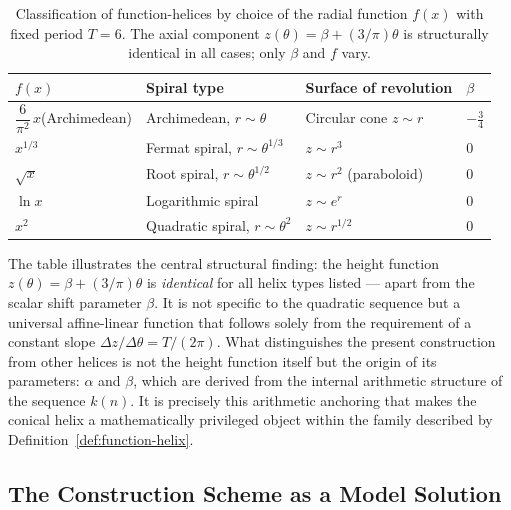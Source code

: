 \begin{table}[H]
\centering
\caption{Classification of function-helices by choice of the radial
  function $f(x)$ with fixed period $T = 6$. The axial component
  $z(\theta) = \beta + (3/\pi)\theta$ is structurally identical in all
  cases; only $\beta$ and $f$ vary.}
\renewcommand{\arraystretch}{1.4}
\begin{tabular}{llll}
\toprule
$f(x)$ & Spiral type & Surface of revolution & $\beta$ \\
\midrule
$\dfrac{6}{\pi^2}\,x$\quad (Archimedean)
  & Archimedean, $r \sim \theta$
  & Circular cone $z \sim r$
  & $-\tfrac{3}{4}$ \\[6pt]
$x^{1/3}$
  & Fermat spiral, $r \sim \theta^{1/3}$
  & $z \sim r^3$
  & $0$ \\[4pt]
$\sqrt{x}$
  & Root spiral, $r \sim \theta^{1/2}$
  & $z \sim r^2$ (paraboloid)
  & $0$ \\[4pt]
$\ln x$
  & Logarithmic spiral
  & $z \sim e^r$
  & $0$ \\[4pt]
$x^2$
  & Quadratic spiral, $r \sim \theta^2$
  & $z \sim r^{1/2}$
  & $0$ \\
\bottomrule
\end{tabular}
\end{table}

\begin{remark}\label{rem:universality-height}
The table illustrates the central structural finding: the height function
$z(\theta) = \beta + (3/\pi)\theta$ is \emph{identical} for all helix
types listed --- apart from the scalar shift parameter $\beta$. It is
not specific to the quadratic sequence but a universal affine-linear
function that follows solely from the requirement of a constant slope
$\Delta z / \Delta\theta = T/(2\pi)$. What distinguishes the present
construction from other helices is not the height function itself but the
origin of its parameters: $\alpha$ and $\beta$, which are derived from
the internal arithmetic structure of the sequence $k(n)$. It is
precisely this arithmetic anchoring that makes the conical helix a
mathematically privileged object within the family described by
Definition~\ref{def:function-helix}.
\end{remark}

\subsection{The Construction Scheme as a Model Solution}

